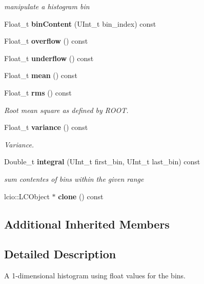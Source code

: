 \begin{DoxyCompactItemize}
\begin{DoxyCompactList}\small\item\em manipulate a histogram bin \end{DoxyCompactList}\item 
Float\-\_\-t {\bfseries bin\-Content} (U\-Int\-\_\-t bin\-\_\-index) const \label{classhistmgr_1_1FloatHistogram1D_a4c772776ba9504a01b41bfdcbc3d4739}

\item 
Float\-\_\-t {\bfseries overflow} () const \label{classhistmgr_1_1FloatHistogram1D_ac043cc91548219a4ed8b499fa3f213cd}

\item 
Float\-\_\-t {\bfseries underflow} () const \label{classhistmgr_1_1FloatHistogram1D_a07f92873077aa35c2f8f615595909f8f}

\item 
Float\-\_\-t {\bfseries mean} () const \label{classhistmgr_1_1FloatHistogram1D_aa62d227b19581c5ad0cb0fa38706c870}

\item 
Float\-\_\-t {\bf rms} () const 
\begin{DoxyCompactList}\small\item\em Root mean square as defined by R\-O\-O\-T. \end{DoxyCompactList}\item 
Float\-\_\-t {\bf variance} () const 
\begin{DoxyCompactList}\small\item\em Variance. \end{DoxyCompactList}\item 
Double\-\_\-t {\bf integral} (U\-Int\-\_\-t first\-\_\-bin, U\-Int\-\_\-t last\-\_\-bin) const 
\begin{DoxyCompactList}\small\item\em sum contentes of bins within the given range \end{DoxyCompactList}\item 
lcio\-::\-L\-C\-Object $\ast$ {\bfseries clone} () const \label{classhistmgr_1_1FloatHistogram1D_a5edd2500f06f2b1bfd015d9ae4639175}

\end{DoxyCompactItemize}
\subsection*{Additional Inherited Members}


\subsection{Detailed Description}
A 1-\/dimensional histogram using float values for the bins. 

